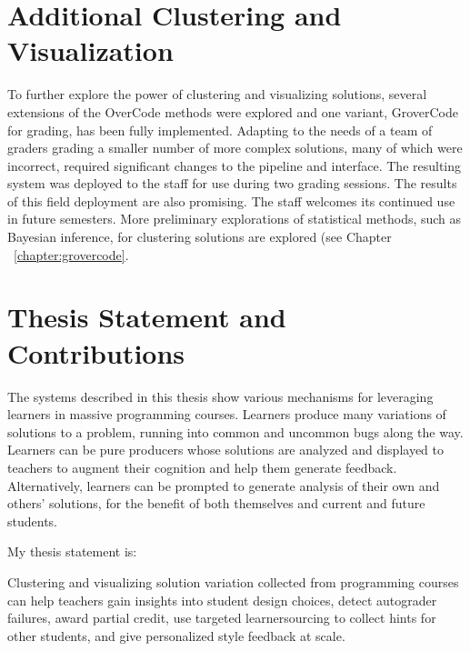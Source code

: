 \section{Additional Clustering and Visualization}

To further explore the power of clustering and visualizing solutions, several extensions of the OverCode methods were explored and one variant, GroverCode for grading, has been fully implemented. Adapting to the needs of a team of graders grading a smaller number of more complex solutions, many of which were incorrect, required significant changes to the pipeline and interface. The resulting system was deployed to the staff for use during two grading sessions. The results of this field deployment are also promising. The staff welcomes its continued use in future semesters. More preliminary explorations of statistical methods, such as Bayesian inference, for clustering solutions are explored (see Chapter ~\ref{chapter:grovercode}.



\section{Thesis Statement and Contributions}

The systems described in this thesis show various mechanisms for leveraging learners in massive programming courses. Learners produce many variations of solutions to a problem, running into common and uncommon bugs along the way. Learners can be pure producers whose solutions are analyzed and displayed to teachers to augment their cognition and help them generate feedback. Alternatively, learners can be prompted to generate analysis of their own and others' solutions, for the benefit of both themselves and current and future students. %

My thesis statement is: 
\begin{displayquote}
Clustering and visualizing solution variation collected from programming courses can help teachers gain insights into student design choices, detect autograder failures, award partial credit, use targeted learnersourcing to collect hints for other students, and give personalized style feedback at scale.
\end{displayquote}

